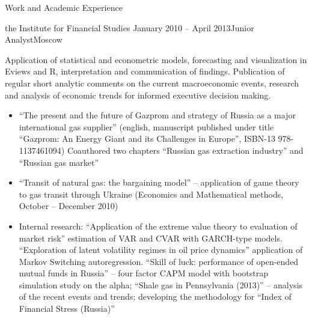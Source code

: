 \documentclass{resume} %
\begin{document}
\begin{rSection}{Work and Academic Experience}
\begin{rSubsection}{
        the Institute for Financial Studies
    }{January 2010 -- April 2013}{Junior Analyst}{Moscow}
    \item Application of statistical and econometric models, forecasting and visualization in Eviews and R, interpretation and communication of findings. Publication of regular short analytic comments on the current macroeconomic events, research and analysis of economic trends for informed executive decision making.

    \begin{itemize}
        \item ``The present and the future of Gazprom and strategy of Russia as a major international gas supplier'' (english, manuscript published under title ``Gazprom: An Energy Giant and its Challenges in Europe'', ISBN-13 978-1137461094) Coauthored two chapters ``Russian gas extraction industry'' and ``Russian gas market''

        \item ``Transit of natural gas: the bargaining model'' -- application of game theory to gas transit through Ukraine (Economics and Mathematical methods, October -- December 2010)

        \item Internal research: ``Application of the extreme value theory to evaluation of market risk'' estimation of VAR and CVAR with GARCH-type models. ``Exploration of latent volatility regimes in oil price dynamics'' application of Markov Switching autoregression. ``Skill of luck: performance of open-ended mutual funds in Russia'' -- four factor CAPM model with bootstrap simulation study on the alpha; ``Shale gas in Pennsylvania (2013)'' -- analysis of the recent events and trends; developing the methodology for ``Index of Financial Stress (Russia)''

    \end{itemize}
\end{rSubsection}
\end{rSection}
\end{document}
